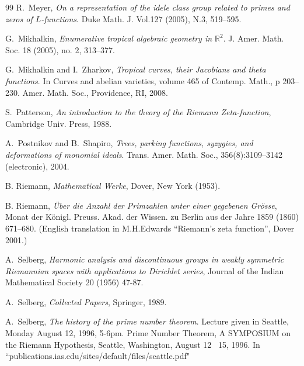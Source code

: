 \documentclass[12pt]{article}
\def\R{{\mathbb R}}
\begin{document}
\begin{thebibliography}{99}
 R.~Meyer, {\em On a representation of the idele class group
related to primes and zeros of $L$-functions}.  Duke Math. J.
Vol.127 (2005),  N.3, 519--595.

 G.~Mikhalkin,
 {\em Enumerative tropical algebraic geometry in $\R^2$}. 
J. Amer. Math. Soc. 18 (2005), no. 2, 313--377.

 G.~Mikhalkin and I.~Zharkov,  {\em Tropical curves, their Jacobians and theta functions}. In Curves and
abelian varieties, volume 465 of Contemp. Math., p 203--230. Amer. Math. Soc., Providence,
RI, 2008.







 S.~Patterson,  {\em An introduction to the theory of the
Riemann Zeta-function}, Cambridge Univ. Press, 1988.




 A.~Postnikov and B.~Shapiro, {\em Trees, parking functions, syzygies, and deformations of monomial
ideals}. Trans. Amer. Math. Soc., 356(8):3109--3142 (electronic), 2004.


\bibitem{[R]} B. Riemann, {\it Mathematical Werke}, Dover, New York (1953).


 B. Riemann, {\em \"Uber die Anzahl der Primzahlen
unter einer gegebenen Gr\"osse}, Monat der K\"onigl. Preuss. Akad.
der Wissen. zu Berlin aus der Jahre 1859 (1860) 671--680. (English
translation in M.H.Edwards ``Riemann's zeta function'', Dover 2001.)




 A.~Selberg,  {\em Harmonic analysis and discontinuous groups in weakly symmetric Riemannian spaces with applications to Dirichlet series}, Journal of the Indian Mathematical Society 20 (1956) 47-87.

\bibitem{[Se]} A.~Selberg, {\it Collected Papers}, Springer, 1989.

 A.~Selberg, {\em The history of the prime number theorem}. Lecture given in Seattle, Monday August 12, 1996, 5-6pm.
Prime Number Theorem, A SYMPOSIUM on the Riemann Hypothesis, Seattle, Washington, August 12 ~15, 1996. In
``publications.ias.edu/sites/default/files/seattle.pdf"





\end{thebibliography}
\end{document}
